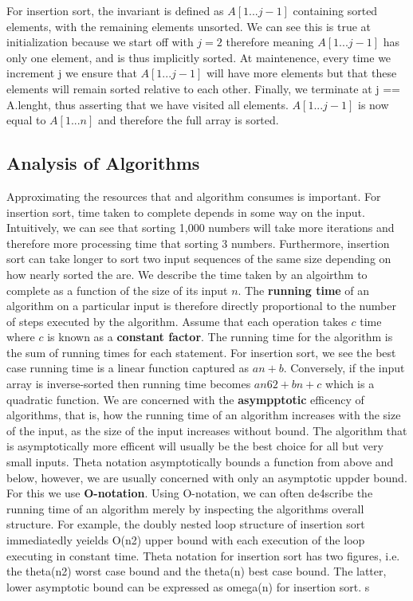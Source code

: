 \documentclass[10pt,a4paper]{article}
\begin{document}
\newline\newline
For insertion sort, the invariant is defined as $A[1...j-1]$ containing sorted elements, with the remaining elements unsorted. We can see this is true at initialization because we start off with $j=2$ therefore meaning $A[1...j-1]$ has only one element, and is thus implicitly sorted. At maintenence, every time we increment j we ensure that $A[1...j-1]$ will have more elements but that these elements will remain sorted relative to each other. Finally, we terminate at j == A.lenght, thus asserting that we have visited all elements. $A[1...j-1]$ is now equal to $A[1...n]$ and therefore the full array is sorted. 
\subsection{Analysis of Algorithms}
Approximating the resources that and algorithm consumes is important. For insertion sort, time taken to complete depends in some way on the input. Intuitively, we can see that sorting 1,000 numbers will take more iterations and therefore more processing time that sorting 3 numbers. Furthermore, insertion sort can take longer to sort two input sequences of the same size depending on how nearly sorted the are. We describe the time taken by an algoirthm to complete as a function of the size of its input $n$. The {\bf running time} of an algorithm on a particular input is therefore directly proportional to the number of steps executed by the algorithm. Assume that each operation takes $c$ time where $c$ is known as a {\bf constant factor}. The running time for the algorithm is the sum of running times for each statement. For insertion sort, we see the best case running time is a linear function captured as $an + b$. Conversely, if the input array is inverse-sorted then running time becomes $an62+bn+c$ which is a quadratic function.
\newline\newline
We are concerned with the {\bf asympptotic} efficency of algorithms, that is, how the running time of an algorithm increases with the size of the input, as the size of the input increases without bound. The algorithm that is asymptotically more efficent will usually be the best choice for all but very small inputs. Theta notation asymptotically bounds a function from above and below, however, we are usually concerned with only an asymptotic uppder bound. For this we use {\bf O-notation}. Using O-notation, we can often de4scribe the running time of an algorithm merely by inspecting the algorithms overall structure. For example, the doubly nested loop structure of insertion sort immediatedly yeields O(n2) upper bound with each execution of the loop executing in constant time. Theta notation for insertion sort has two figures, i.e. the theta(n2) worst case bound and the theta(n) best case bound. The latter, lower asymptotic bound can be expressed as omega(n) for insertion sort. s
\end{document}
